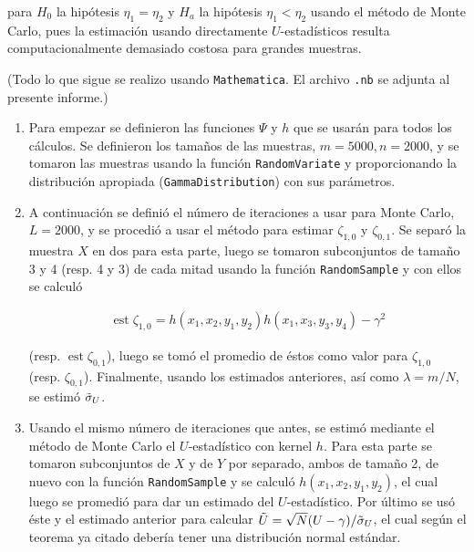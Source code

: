 \documentclass[letter]{article}
\begin{document}
para $H_0$ la hipótesis $\eta_1 = \eta_2$ y $H_a$ la hipótesis $\eta_1 < \eta_2$ usando el método de Monte Carlo, pues la estimación usando directamente $U$-estadísticos resulta computacionalmente demasiado costosa para grandes muestras.

(Todo lo que sigue se realizo usando \texttt{Mathematica}. El archivo \texttt{.nb} se adjunta al presente informe.)

\begin{enumerate}
\setcounter{enumi}{0}

\item Para empezar se definieron las funciones $\Psi$ y $h$ que se usarán para todos los cálculos. Se definieron los tamaños de las muestras, $m = 5000, n = 2000$, y se tomaron las muestras usando la función \texttt{RandomVariate} y proporcionando la distribución apropiada (\texttt{GammaDistribution}) con sus parámetros.

\item A continuación se definió el número de iteraciones a usar para Monte Carlo, $L = 2000$, y se procedió a usar el método para estimar $\zeta_{1,0}$ y $\zeta_{0,1}$. Se separó la muestra $X$ en dos para esta parte, luego se tomaron subconjuntos de tamaño 3 y 4 (resp. 4 y 3) de cada mitad usando la función \texttt{RandomSample} y con ellos se calculó

\begin{align*}
    \operatorname{est}\zeta_{1,0} = h(x_1,x_2,y_1,y_2)h(x_1,x_3,y_3,y_4) - \gamma^2
\end{align*}

(resp. $\operatorname{est}\zeta_{0,1}$), luego se tomó el promedio de éstos como valor para $\zeta_{1,0}$ (resp. $\zeta_{0,1}$). Finalmente, usando los estimados anteriores, así como $\lambda = m/N$, se estimó $\Tilde{\sigma}_U$.

\item Usando el mismo número de iteraciones que antes, se estimó mediante el método de Monte Carlo el $U$-estadístico con kernel $h$. Para esta parte se tomaron subconjuntos de $X$ y de $Y$ por separado, ambos de tamaño 2, de nuevo con la función \texttt{RandomSample} y se calculó $h(x_1,x_2,y_1,y_2)$, el cual luego se promedió para dar un estimado del $U$-estadístico. Por último se usó éste y el estimado anterior para calcular $\Tilde{U} = \sqrt{N}(U - \gamma)/\Tilde{\sigma}_U$, el cual según el teorema ya citado debería tener una distribución normal estándar.


\end{enumerate}
\end{document}
